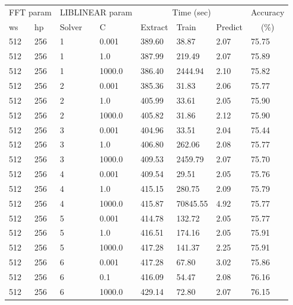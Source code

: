 \begin{table}
\begin{tabular}{|l|l|l|l|l|l|l|l|}
\hline
\multicolumn{2}{|c}{FFT param} & \multicolumn{2}{|c}{LIBLINEAR param} & \multicolumn{3}{|c|}{Time (sec)} &  Accuracy \\
\hhline{|-|-|-|-|-|-|-|~|}
ws & hp & Solver & C & Extract & Train & Predict & \multicolumn{1}{c|}{(\%)} \\
\hhline{|=|=|=|=|=|=|=|=|}
 512 & 256     &   1 & 0.001   &  389.60  &     38.87  &  2.07  &  75.75  \\
 512 & 256     &   1 & 1.0     &  387.99  &    219.49  &  2.07  &  75.89  \\
 512 & 256     &   1 & 1000.0  &  386.40  &   2444.94  &  2.10  &  75.82  \\
\hline
 512 & 256     &   2 & 0.001   &  385.36  &     31.83  &  2.06  &  75.77  \\
 512 & 256     &   2 & 1.0     &  405.99  &     33.61  &  2.05  &  75.90  \\
 512 & 256     &   2 & 1000.0  &  405.82  &     31.86  &  2.12  &  75.90  \\
\hline
 512 & 256     &   3 & 0.001   &  404.96  &     33.51  &  2.04  &  75.44  \\
 512 & 256     &   3 & 1.0     &  406.80  &    262.06  &  2.08  &  75.77  \\
 512 & 256     &   3 & 1000.0  &  409.53  &   2459.79  &  2.07  &  75.70  \\
\hline
 512 & 256     &   4 & 0.001   &  409.54  &     29.51  &  2.05  &  75.76  \\
 512 & 256     &   4 & 1.0     &  415.15  &    280.75  &  2.09  &  75.79  \\
 512 & 256     &   4 & 1000.0  &  415.87  &  70845.55  &  4.92  &  75.77  \\
\hline
 512 & 256     &   5 & 0.001   &  414.78  &    132.72  &  2.05  &  75.77  \\
 512 & 256     &   5 & 1.0     &  416.51  &    174.16  &  2.05  &  75.91  \\
 512 & 256     &   5 & 1000.0  &  417.28  &    141.37  &  2.25  &  75.91  \\
\hline
 512 & 256     &   6 & 0.001   &  417.28  &     67.80  &  3.02  &  75.86  \\
 512 & 256     &   6 & 0.1     &  416.09  &     54.47  &  2.08  &  76.16  \\
 512 & 256     &   6 & 1000.0  &  429.14  &     72.80  &  2.07  &  76.15  \\

\end{tabular}
\end{table}
